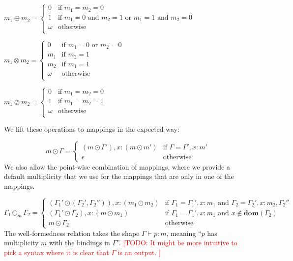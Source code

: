 \documentclass{article}
\newcommand{\RED}[1]{\textcolor{red}{#1}}
\newcommand{\TODO}[1]{\RED{[TODO: #1]}}
\newcommand{\wfp}[3]{\ensuremath{#1 \vdash #2 : #3}}
\begin{document}
$
  m_1 \oplus m_2 =
  \begin{cases}
    0 & \text{if $m_1 = m_2 = 0$}\\
    1 & \text{if $m_1 = 0$ and $m_2 = 1$ or $m_1 = 1$ and $m_2 = 0$}\\
    \omega & \text{otherwise}\\
  \end{cases}
$

$
  m_1 \otimes m_2 =
  \begin{cases}
    0 & \text{if $m_1 = 0$ or $m_2 = 0$}\\
    m_1 & \text{if $m_2 = 1$}\\
    m_2 & \text{if $m_1 = 1$}\\
    \omega & \text{otherwise}\\
  \end{cases}
$

$
  m_1 \oslash m_2 =
  \begin{cases}
    0 & \text{if $m_1 = m_2 = 0$}\\
    1 & \text{if $m_1 = m_2 = 1$}\\
    \omega & \text{otherwise}\\
  \end{cases}
$

\noindent
We lift these operations to mappings in the expected way:

\[
  m \odot \Gamma =
  \begin{cases}
    (m \odot \Gamma'), x : (m \odot m') & \text{if } \Gamma = \Gamma', x : m'\\
    \epsilon & \text{otherwise}
  \end{cases}
\]
%
We also allow the point-wise combination of mappings, where we
provide a default multiplicity that we use for the mappings that
are only in one of the mappings.


\[
  \Gamma_1 \odot_m \Gamma_2 =
  \begin{cases}
    (\Gamma_1' \odot (\Gamma_2', \Gamma_2'')), x : (m_1 \odot m_2) &
    \text{if } \Gamma_1 = \Gamma_1', x : m_1 \text{ and } \Gamma_2 = \Gamma_2', x : m_2, \Gamma_2''\\
    (\Gamma_1' \odot \Gamma_2), x : (m \odot m_1) &
    \text{if } \Gamma_1 = \Gamma_1', x : m_1 \text{ and } x \notin \mathbf{dom}(\Gamma_2)\\
    m \odot \Gamma_2 & \text{otherwise}
  \end{cases}
\]
%
The well-formedness relation takes the shape \wfp{\Gamma}{p}{m},
meaning ``$p$ has multiplicity $m$ with the bindings in
$\Gamma$''. \TODO{It might be more intuitive to pick a syntax
  where it is clear that $\Gamma$ is an output. }
\end{document}
